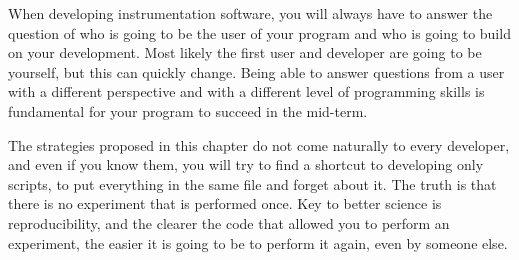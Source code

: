 When developing instrumentation software, you will always have to answer
the question of who is going to be the user of your program and who is
going to build on your development. Most likely the first user and
developer are going to be yourself, but this can quickly change. Being
able to answer questions from a user with a different perspective and
with a different level of programming skills is fundamental for your
program to succeed in the mid-term.

The strategies proposed in this chapter do not come naturally to every
developer, and even if you know them, you will try to find a shortcut to
developing only scripts, to put everything in the same file and forget
about it. The truth is that there is no experiment that is performed
once. Key to better science is reproducibility, and the clearer the code
that allowed you to perform an experiment, the easier it is going to be
to perform it again, even by someone else.

